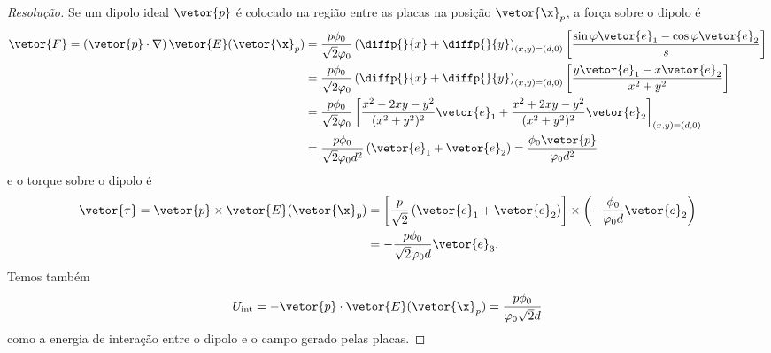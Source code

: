 \begin{proof}[Resolução]
    Se um dipolo ideal \(\vetor{p}\) é colocado na região entre as placas na posição \(\vetor{\x}_p\), a força sobre o dipolo é
    \begin{align*}
        \vetor{F} = \left(\vetor{p}\cdot \nabla\right)\vetor{E}(\vetor{\x}_p)
        &= \frac{p\phi_0}{\sqrt{2}\varphi_0}\left(\diffp{}{x} + \diffp{}{y}\right)_{(x,y) = (d,0)}\left[\frac{\sin\varphi \vetor{e}_1 - \cos\varphi\vetor{e}_2}{s}\right]\\
        &=\frac{p\phi_0}{\sqrt{2}\varphi_0}\left(\diffp{}{x} + \diffp{}{y}\right)_{(x,y)=(d,0)}\left[\frac{y \vetor{e}_1 - x\vetor{e}_2}{x^2 + y^2}\right]\\
        &=  \frac{p \phi_0}{\sqrt{2}\varphi_0} \left[\frac{x^2 - 2xy - y^2}{(x^2 + y^2)^2}\vetor{e}_1 + \frac{x^2 + 2xy - y^2}{(x^2 + y^2)^2}\vetor{e}_2\right]_{(x,y) = (d,0)}\\
        &=  \frac{p \phi_0}{\sqrt{2} \varphi_0d^2}\left(\vetor{e}_1 + \vetor{e}_2\right) = \frac{\phi_0\vetor{p}}{\varphi_0 d^2}
    \end{align*}
    e o torque sobre o dipolo é
    \begin{align*}
        \vetor{\tau} = \vetor{p} \times \vetor{E}(\vetor{\x}_p) &= \left[\frac{p}{\sqrt{2}}\left(\vetor{e}_1 + \vetor{e}_2\right)\right] \times \left(-\frac{\phi_0}{\varphi_0 d}\vetor{e}_2\right)\\
                                                                &= - \frac{p\phi_0}{\sqrt{2} \varphi_0 d}\vetor{e}_3.
    \end{align*}
    Temos também
    \begin{equation*}
        U_\mathrm{int} = - \vetor{p} \cdot \vetor{E}(\vetor{\x}_p) = \frac{p\phi_0}{\varphi_0\sqrt{2}d}
    \end{equation*}
    como a energia de interação entre o dipolo e o campo gerado pelas placas.
\end{proof}
